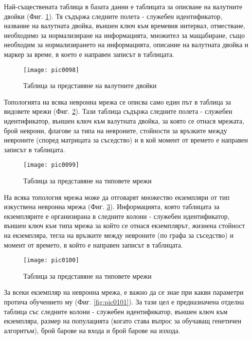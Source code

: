 Най-съществената таблица в базата данни е таблицата за описване на валутните двойки (Фиг. \ref{fig:pic0098}). Тя съдържа следните полета - служебен идентификатор, название на валутната двойка, външен ключ към времевия интервал, отместване, необходимо за нормализиране на информацията, множител за мащабиране, също необходим за нормализирането на информацията, описание на валутната двойка и маркер за време, в което е направен записът в таблицата. 

\begin{figure}[h]
  \centering
  \texttt{[image: pic0098]}
  \caption{Таблица за представяне на валутните двойки}
\label{fig:pic0098}
\end{figure}
\FloatBarrier

Топологията на всяка невронна мрежа се описва само един път в таблица за видовете мрежи (Фиг. \ref{fig:pic0099}). Тази таблица съдържа следните полета - служебен идентификатор, външен ключ към валутната двойка, за която се отнася мрежата, брой неврони, флагове за типа на невроните, стойности за връзките между невроните (според матрицата за съседство) и в кой момент от времето е направен записът в таблицата. 

\begin{figure}[h]
  \centering
  \texttt{[image: pic0099]}
  \caption{Таблица за представяне на типовете мрежи}
\label{fig:pic0099}
\end{figure}
\FloatBarrier

На всяка топология мрежа може да отговарят множество екземпляри от тип изкуствена невронна мрежа (Фиг. \ref{fig:pic0100}). {\color{red} Информацията, която таблицата за екземплярите е организирана в следните колони} - служебен идентификатор, външен ключ към типа мрежа за който се отнася екземплярът, жизнена стойност на екземпляра, тегла на връзките между невроните (по графа за съседство) и момент от времето, в който е направен записът в таблицата. 

\begin{figure}[h]
  \centering
  \texttt{[image: pic0100]}
  \caption{Таблица за представяне на типовете мрежи}
\label{fig:pic0100}
\end{figure}
\FloatBarrier

За всеки екземпляр на невронна мрежа, е важно да се знае при какви параметри протича обучението му (Фиг. \ref{fig:pic0101}). За тази цел е предназначена отделна таблица със следните колони - служебен идентификатор, външен ключ към екземпляра, размер на популацията (когато става въпрос за обучаващ генетичен алгоритъм), брой барове на входа и брой барове на изхода.

